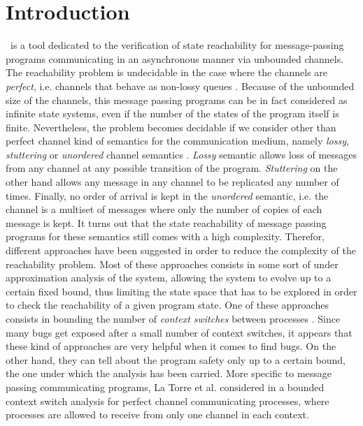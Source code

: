 \section{Introduction}

\MPass\ is a tool dedicated to the verification of state reachability for message-passing programs 
communicating in an asynchronous manner via unbounded channels.
%
The reachability problem is undecidable in the case where the channels are \textit{perfect},
i.e. channels that behave as non-lossy queues\cite{BZ83} .
%
Because of the unbounded size of the channels, this message passing programs can be in fact considered as infinite state systems,
even if the number of the states of the program itself is finite.
%
Nevertheless, the problem becomes decidable if we consider other than perfect channel kind of semantics for the communication medium,
namely \textit{lossy}, \textit{stuttering} or \textit{unordered} channel semantics \cite{AB93,Rack78,phs-IPL2002,lipton}.
\textit{Lossy} semantic allows loss of messages from any channel at any possible transition of the program.
\textit{Stuttering} on the other hand allows any message in any channel to be replicated any number of times.
Finally, no order of arrival is kept in the \textit{unordered} semantic, 
i.e. the channel is a multiset of messages where only the number of copies of each message is kept.
%
It turns out that the state reachability of message passing programs for these semantics
still comes with a high complexity.
%
Therefor, different approaches have been suggested in order to reduce the complexity of the reachability problem.
%
Most of these approaches consists in some sort of under approximation analysis of the system,
allowing the system to evolve up to a certain fixed bound, thus limiting the state space that has to be explored
in order to check the reachability of a given program state.
%
One of these approaches consists in bounding the number of \textit{context switches} between processes \cite{SJ05}.
%
Since many bugs get exposed after a small number of context switches,
it appears that these kind of approaches are very helpful when it comes to find bugs.
%
On the other hand, they can tell about the program safety only up to a certain bound, the one under which the analysis has been carried.
%
More specific to message passing communicating programs,
La Torre et al. considered in \cite{LaTorre08} a bounded context switch analysis for perfect channel communicating processes,
where processes are allowed to receive from only one channel in each context.


